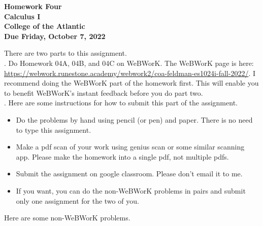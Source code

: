 \documentclass[12pt]{article}
\begin{document}
\pagestyle{empty}
 
\begin{center}
{\LARGE {\bf Homework Four}}\\
\bigskip
{\Large {\bf Calculus I}}\\
\bigskip
{\Large {\bf College of the Atlantic}}\\
\bigskip
{ {\bf Due Friday, October 7, 2022}}\\ 
\end{center}
\medskip


\noindent There are two parts to this assignment.\\

.  Do Homework 04A, 04B, and 04C on
WeBWorK.  The WeBWorK page is here: 
\url{https://webwork.runestone.academy/webwork2/coa-feldman-es1024i-fall-2022/}.
I recommend doing the WeBWorK part of the homework first.  This will
enable you to benefit WeBWorK's instant feedback before you do part
two.\\ 


.  Here are some
instructions for how to submit this part of the assignment.
\begin{itemize}
  \setlength{\itemsep}{0mm}
\item Do the problems by hand using pencil (or pen) and paper.
  There is no need to type this assignment.
\item Make a pdf scan of your work using genius scan or some
  similar scanning app.  Please make the homework into a single
  pdf, not multiple pdfs.
\item Submit the assignment on google classroom.  Please don't
  email it to me.
\item If you want, you can do the non-WeBWorK problems in pairs and
  submit only one assignment for the two of you. \\
\end{itemize}

\noindent Here are some non-WeBWorK problems.
\end{document}
